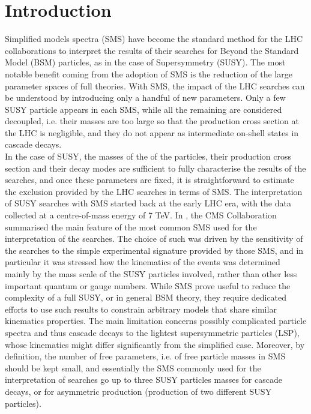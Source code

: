 \documentclass[epj,nopacs,fleqn]{svjour}
\begin{document}
\newcommand{\TGQ}{ \textit{T3GQ}} 
\newcommand{\Ttwo}{ \textit{T2}} 
\newcommand{\Tfive}{ \textit{T5}} 

\newcommand{\ONE}{\onecolumn}

\newcommand{\TWO}{\twocolumn}

%
\section{Introduction}
Simplified models spectra (SMS) have become the standard method for the LHC collaborations to interpret the results of their searches for Beyond the Standard Model (BSM) particles, as in the case of Supersymmetry (SUSY). The most notable benefit coming from the adoption of SMS is the  reduction of the large parameter spaces of full theories. With SMS, the impact of the LHC searches can be understood by introducing only a handful of new parameters. Only a few SUSY particle appears in each SMS, while all the remaining are considered decoupled, i.e. their masses are too large so that the production cross section at the LHC is negligible, and they do not appear as intermediate on-shell states in cascade decays. 
\\

In the case of SUSY, the masses of the of the particles, their production cross section and their decay modes are sufficient to fully characterise the results of the searches, and once these parameters are fixed, it is straightforward to estimate the exclusion provided by the LHC searches in terms of SMS. The interpretation of SUSY searches with SMS started back at the early LHC era, with the data collected at a centre-of-mass energy of 7 TeV. In \cite{Chatrchyan:2013sza}, the CMS Collaboration summarised the main feature of the most common SMS used for the interpretation of the searches. The choice of such was driven by the sensitivity of the searches to the simple experimental signature provided by those SMS, and in particular it was stressed how the kinematics of the events was determined mainly by the mass scale of the SUSY particles involved, rather than other less important quantum or gauge numbers. While SMS prove useful to reduce the complexity of a full SUSY, or in general BSM theory, they require dedicated efforts to use such results to constrain arbitrary models that share similar kinematics properties. The main limitation concerns possibly complicated particle spectra and thus cascade decays to the lightest supersymmetric particles (LSP), whose kinematics might differ significantly from the simplified case. Moreover, by definition, the number of free parameters, i.e. of free particle masses in SMS should be kept small, and essentially the SMS commonly used for the interpretation of searches go up to three SUSY particles masses for cascade decays, or for asymmetric production (production of two different SUSY particles).
\end{document}
